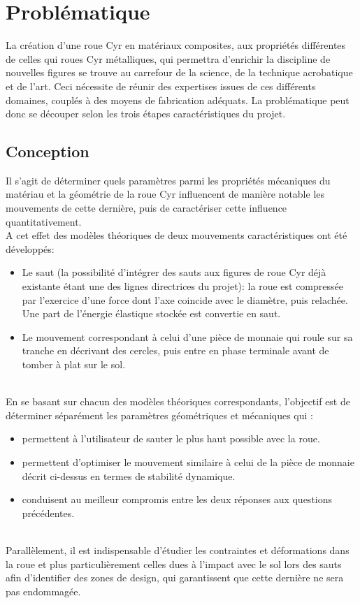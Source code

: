 \clearpage

\section{Problématique}  %
La création d'une roue Cyr en matériaux composites, aux propriétés différentes de celles qui roues Cyr métalliques, qui permettra d'enrichir la discipline de nouvelles figures se trouve au carrefour de la science, de la technique acrobatique et de l'art. Ceci nécessite de réunir des expertises issues de ces différents domaines, couplés à des moyens de fabrication adéquats. La problématique peut donc se découper selon les trois étapes caractéristiques du projet.

\subsection{Conception}
Il s'agit de déterminer quels paramètres parmi les propriétés mécaniques du matériau et la géométrie de la roue Cyr influencent de manière notable les mouvements de cette dernière, puis de caractériser cette influence quantitativement. \\ 
A cet effet des modèles théoriques de deux mouvements caractéristiques ont été développés:
\begin{itemize}
\item Le saut (la possibilité d’intégrer des sauts aux figures de roue Cyr déjà existante étant une des lignes directrices du projet): la roue est compressée par l'exercice d'une force dont l’axe coincide avec le diamètre, puis relachée. Une part de l’énergie élastique stockée est convertie en saut. 
\item Le mouvement correspondant à celui d’une pièce de monnaie qui roule sur sa tranche en décrivant des cercles, puis entre en phase terminale avant de tomber à plat sur le sol.
\end{itemize}
\\
En se basant sur chacun des modèles théoriques correspondants, l’objectif est de déterminer séparément les paramètres géométriques et mécaniques qui :
\begin{itemize}
\item  permettent à l’utilisateur de sauter le plus haut possible avec la roue.
\item permettent d’optimiser le mouvement similaire à celui de la pièce de monnaie décrit ci-dessus en termes de stabilité dynamique.
\item conduisent au meilleur compromis entre les deux réponses aux questions précédentes.
\end{itemize}
\\
Parallèlement, il est indispensable d’étudier les contraintes et déformations dans la roue et plus particulièrement celles dues à l’impact avec le sol lors des sauts afin d’identifier des zones de design, qui garantissent que cette dernière ne sera pas endommagée.

